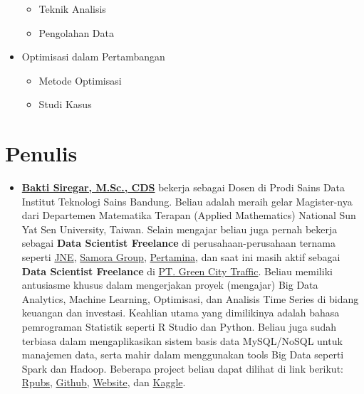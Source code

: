 \documentclass[
]{book}
\providecommand{\tightlist}{%
  \setlength{\itemsep}{0pt}\setlength{\parskip}{0pt}}
\begin{document}
\begin{itemize}
  \begin{itemize}
  \tightlist
  \item
    Teknik Analisis
  \item
    Pengolahan Data
  \end{itemize}
\item
  Optimisasi dalam Pertambangan

  \begin{itemize}
  \tightlist
  \item
    Metode Optimisasi
  \item
    Studi Kasus
  \end{itemize}
\end{itemize}

\section*{Penulis}\label{penulis}

\begin{itemize}
\tightlist
\item
  \textbf{\href{https://www.linkedin.com/in/dsciencelabs/}{Bakti Siregar, M.Sc., CDS}} bekerja sebagai Dosen di Prodi Sains Data Institut Teknologi Sains Bandung. Beliau adalah meraih gelar Magister-nya dari Departemen Matematika Terapan (Applied Mathematics) National Sun Yat Sen University, Taiwan. Selain mengajar beliau juga pernah bekerja sebagai \textbf{Data Scientist Freelance} di perusahaan-perusahaan ternama seperti \href{https://www.jne.co.id/id/beranda}{JNE}, \href{https://www.samoragroup.co.id/home/en}{Samora Group}, \href{https://www.pertamina.com/}{Pertamina}, dan saat ini masih aktif sebagai \textbf{Data Scientist Freelance} di \href{PT.\%20Green\%20City\%20Traffic}{PT. Green City Traffic}. Beliau memiliki antusiasme khusus dalam mengerjakan proyek (mengajar) Big Data Analytics, Machine Learning, Optimisasi, dan Analisis Time Series di bidang keuangan dan investasi. Keahlian utama yang dimilikinya adalah bahasa pemrograman Statistik seperti R Studio dan Python. Beliau juga sudah terbiasa dalam mengaplikasikan sistem basis data MySQL/NoSQL untuk manajemen data, serta mahir dalam menggunakan tools Big Data seperti Spark dan Hadoop. Beberapa project beliau dapat dilihat di link berikut: \href{https://rpubs.com/dsciencelabs}{Rpubs}, \href{https://github.com/dsciencelabs}{Github}, \href{https://dsciencelabs.github.io/web/index.html}{Website}, dan \href{https://www.kaggle.com/baktisiregar/code}{Kaggle}.
\end{itemize}
\end{document}
